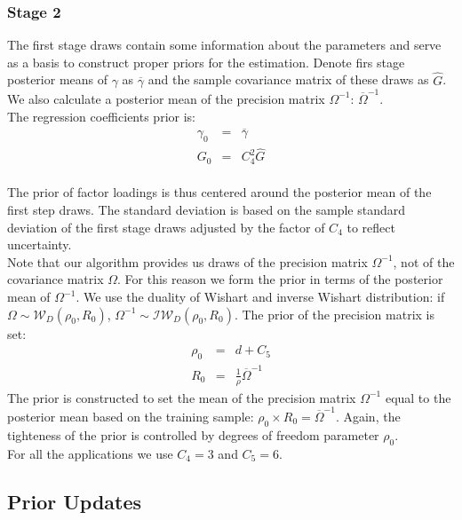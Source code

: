 \documentclass[12pt]{article}
\begin{document}
\subsubsection{Stage 2}
The first stage draws contain some information about the parameters and serve as a basis to construct proper priors for the estimation. Denote firs stage posterior means of $\gamma$ as $\overline{\gamma}$ and the sample covariance matrix of these draws as $\widehat{G}$. We also calculate a posterior mean of the precision matrix $\Omega^{-1}$: $\overline{\Omega}^{-1}$. \\
The regression coefficients prior is:
\begin{eqnarray*}
	\gamma_{0} &=& \overline{\gamma} \\ 
	G_{0} &=& C_{4}^{2} \widehat{G}
\end{eqnarray*}\\
The prior of factor loadings is thus centered around the posterior mean of the first step draws. The  standard deviation is based on the sample standard deviation of the first stage draws adjusted by the factor of $C_{4}$ to reflect uncertainty.\\
 Note that our algorithm  provides us draws of the precision matrix $\Omega^{-1}$, not of the covariance matrix $\Omega$. For this reason we form the prior in terms of the posterior mean of ${\Omega}^{-1}$. We use the duality of Wishart and inverse Wishart distribution: if $\Omega \sim \mathcal{W}_D\left(\rho_0, R_0 \right)$, $\Omega^{-1} \sim \mathcal{IW}_D\left(\rho_0, R_0 \right)$. The prior of the precision matrix is set:
\begin{eqnarray*}
	\rho_{0} &=& d + C_{5} \\ 
	R_{0} &=& \frac{1}{\rho} \overline{\Omega}^{-1}
\end{eqnarray*}
The prior is constructed to set the mean of the precision matrix $\Omega^{-1}$ equal to the posterior mean based on the training sample: $\rho_{0} \times R_{0} =\overline{\Omega}^{-1} $. Again, the tighteness of the prior is controlled by degrees of freedom parameter $\rho_{0}$. \\
For all the applications we use $C_{4} = 3$ and $C_5 = 6$.
\subsection{Prior Updates}
\end{document}
